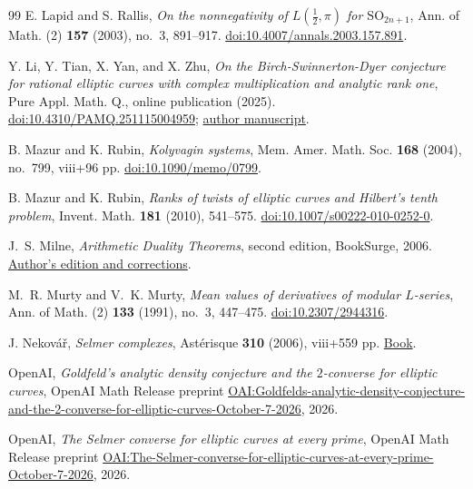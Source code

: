 \begin{thebibliography}{99}
E. Lapid and S. Rallis,
\emph{On the nonnegativity of $L(\tfrac12,\pi)$ for $\mathrm{SO}_{2n+1}$},
Ann. of Math. (2) \textbf{157} (2003), no.~3, 891--917.
\href{https://doi.org/10.4007/annals.2003.157.891}{doi:10.4007/annals.2003.157.891}.

Y. Li, Y. Tian, X. Yan, and X. Zhu,
\emph{On the Birch-Swinnerton-Dyer conjecture for rational elliptic curves with complex multiplication and analytic rank one},
Pure Appl. Math. Q., online publication (2025).
\href{https://doi.org/10.4310/PAMQ.251115004959}{doi:10.4310/PAMQ.251115004959};
\href{https://xiuwuzhu.com/pub/cmbsd.pdf}{author manuscript}.

B. Mazur and K. Rubin,
\emph{Kolyvagin systems},
Mem. Amer. Math. Soc. \textbf{168} (2004), no.~799, viii+96 pp.
\href{https://doi.org/10.1090/memo/0799}{doi:10.1090/memo/0799}.

B. Mazur and K. Rubin,
\emph{Ranks of twists of elliptic curves and Hilbert's tenth problem},
Invent. Math. \textbf{181} (2010), 541--575.
\href{https://doi.org/10.1007/s00222-010-0252-0}{doi:10.1007/s00222-010-0252-0}.

J.~S. Milne,
\emph{Arithmetic Duality Theorems}, second edition,
BookSurge, 2006.
\href{https://www.jmilne.org/math/Books/adt.html}{Author's edition and corrections}.

M.~R. Murty and V.~K. Murty,
\emph{Mean values of derivatives of modular $L$-series},
Ann. of Math. (2) \textbf{133} (1991), no.~3, 447--475.
\href{https://doi.org/10.2307/2944316}{doi:10.2307/2944316}.

J. Nekov\'a\v{r},
\emph{Selmer complexes},
Ast\'erisque \textbf{310} (2006), viii+559 pp.
\href{https://www.numdam.org/item/AST_2006__310__R1_0/}{Book}.

OpenAI,
\emph{Goldfeld's analytic density conjecture and the $2$-converse for elliptic curves},
OpenAI Math Release preprint
\href{https://github.com/openai/math/blob/main/preprints/Goldfelds-analytic-density-conjecture-and-the-2-converse-for-elliptic-curves-October-7-2026/paper.pdf}{OAI:Goldfelds-analytic-density-conjecture-and-the-2-converse-for-elliptic-curves-October-7-2026},
2026.

OpenAI,
\emph{The Selmer converse for elliptic curves at every prime},
OpenAI Math Release preprint
\href{https://github.com/openai/math/blob/main/preprints/The-Selmer-converse-for-elliptic-curves-at-every-prime-October-7-2026/main.pdf}{OAI:The-Selmer-converse-for-elliptic-curves-at-every-prime-October-7-2026},
2026.


\end{thebibliography}
